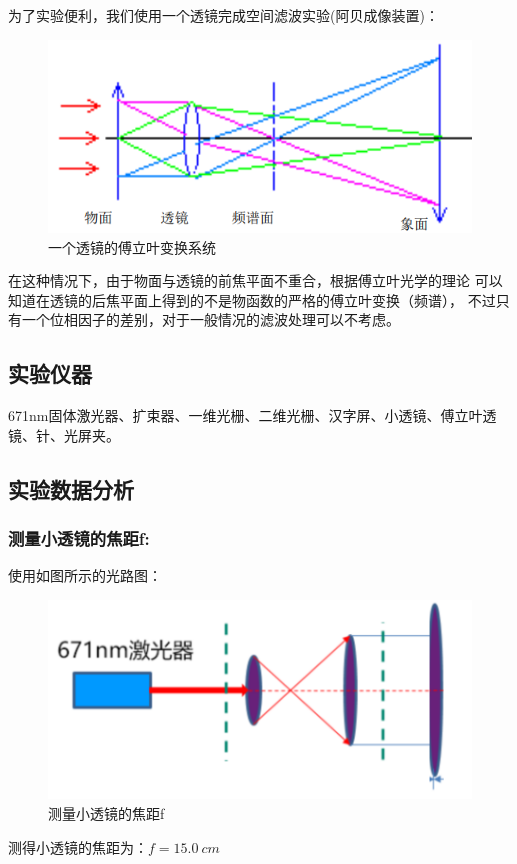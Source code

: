 \documentclass{ctexart}
\begin{document}
为了实验便利，我们使用一个透镜完成空间滤波实验(阿贝成像装置)：
\begin{figure}[htbp]
	\centering
	\includegraphics[scale=0.3]{2.png}
	\caption{一个透镜的傅立叶变换系统}
\end{figure}

在这种情况下，由于物面与透镜的前焦平面不重合，根据傅立叶光学的理论
可以知道在透镜的后焦平面上得到的不是物函数的严格的傅立叶变换（频谱），
不过只有一个位相因子的差别，对于一般情况的滤波处理可以不考虑。


\subsection*{实验仪器}
671nm固体激光器、扩束器、一维光栅、二维光栅、汉字屏、小透镜、傅立叶透镜、针、光屏夹。
\subsection*{实验数据分析}

\subsubsection*{测量小透镜的焦距f:}
使用如图所示的光路图：
\begin{figure}[htbp]
	\centering
	\includegraphics[scale=0.2]{3.png}
	\caption{测量小透镜的焦距f}
\end{figure}
测得小透镜的焦距为：$f = \qty{15.0}{cm}$
\end{document}
